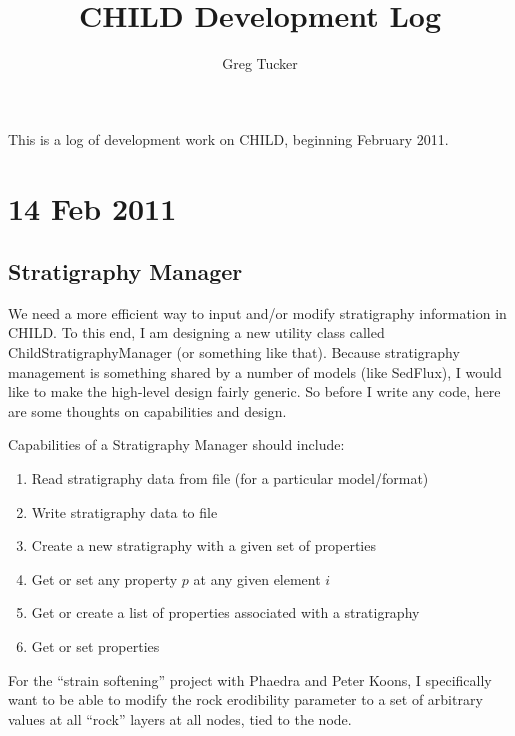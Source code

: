 \documentclass[12pt]{amsart}
\title{CHILD Development Log}
\author{Greg Tucker}
\begin{document}
\maketitle

This is a log of development work on CHILD, beginning February 2011.

\section{14 Feb 2011}
\subsection{Stratigraphy Manager}

We need a more efficient way to input and/or modify stratigraphy information in CHILD. To this end, I am designing a new utility class called ChildStratigraphyManager (or something like that). Because stratigraphy management is something shared by a number of models (like SedFlux), I would like to make the high-level design fairly generic. So before I write any code, here are some thoughts on capabilities and design.

Capabilities of a Stratigraphy Manager should include:
\begin{enumerate}
  \item Read stratigraphy data from file (for a particular model/format)
  \item Write stratigraphy data to file
  \item Create a new stratigraphy with a given set of properties
  \item Get or set any property $p$ at any given element $i$
  \item Get or create a list of properties associated with a stratigraphy
  \item Get or set properties
\end{enumerate}

For the ``strain softening'' project with Phaedra and Peter Koons, I specifically want to be able to modify the rock erodibility parameter to a set of arbitrary values at all ``rock'' layers at all nodes, tied to the node.
\end{document}
